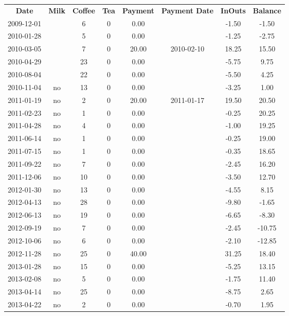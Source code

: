 \begin{center}
\begin{tabular}{cccccccc}
\textbf{Date} & \textbf{Milk} & \textbf{Coffee} & \textbf{Tea} & \textbf{Payment} & \textbf{Payment Date} & \textbf{InOuts} & \textbf{Balance} \\
2009-12-01 &  &  6 & 0 &  0.00 &  & -1.50 &  -1.50\\ 
2010-01-28 &  &  5 & 0 &  0.00 &  & -1.25 &  -2.75\\ 
2010-03-05 &  &  7 & 0 & 20.00 & 2010-02-10 & 18.25 &  15.50\\ 
2010-04-29 &  & 23 & 0 &  0.00 &  & -5.75 &   9.75\\ 
2010-08-04 &  & 22 & 0 &  0.00 &  & -5.50 &   4.25\\ 
2010-11-04 & no & 13 & 0 &  0.00 &  & -3.25 &   1.00\\ 
2011-01-19 & no &  2 & 0 & 20.00 & 2011-01-17 & 19.50 &  20.50\\ 
2011-02-23 & no &  1 & 0 &  0.00 &  & -0.25 &  20.25\\ 
2011-04-28 & no &  4 & 0 &  0.00 &  & -1.00 &  19.25\\ 
2011-06-14 & no &  1 & 0 &  0.00 &  & -0.25 &  19.00\\ 
2011-07-15 & no &  1 & 0 &  0.00 &  & -0.35 &  18.65\\ 
2011-09-22 & no &  7 & 0 &  0.00 &  & -2.45 &  16.20\\ 
2011-12-06 & no & 10 & 0 &  0.00 &  & -3.50 &  12.70\\ 
2012-01-30 & no & 13 & 0 &  0.00 &  & -4.55 &   8.15\\ 
2012-04-13 & no & 28 & 0 &  0.00 &  & -9.80 &  -1.65\\ 
2012-06-13 & no & 19 & 0 &  0.00 &  & -6.65 &  -8.30\\ 
2012-09-19 & no &  7 & 0 &  0.00 &  & -2.45 & -10.75\\ 
2012-10-06 & no &  6 & 0 &  0.00 &  & -2.10 & -12.85\\ 
2012-11-28 & no & 25 & 0 & 40.00 &  & 31.25 &  18.40\\ 
2013-01-28 & no & 15 & 0 &  0.00 &  & -5.25 &  13.15\\ 
2013-02-08 & no &  5 & 0 &  0.00 &  & -1.75 &  11.40\\ 
2013-04-14 & no & 25 & 0 &  0.00 &  & -8.75 &   2.65\\ 
2013-04-22 & no &  2 & 0 &  0.00 &  & -0.70 &   1.95
\end{tabular}
\end{center}

